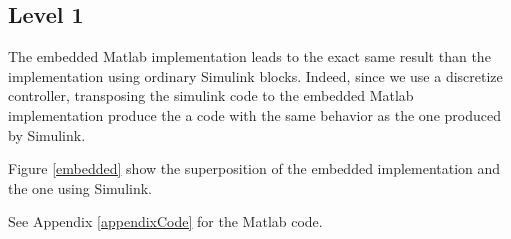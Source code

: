 \subsection*{Level 1}

The embedded Matlab implementation leads to the exact same result than the implementation using ordinary Simulink blocks. Indeed, since we use a discretize controller, transposing the simulink code to the embedded Matlab implementation produce the a code with the same behavior as the one produced by Simulink.

Figure \ref{embedded} show the superposition of the embedded implementation and the one using Simulink.

See Appendix \ref{appendixCode} for the Matlab code.

